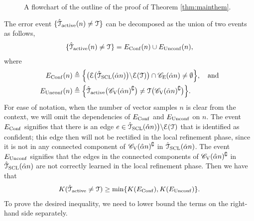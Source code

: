 \begin{figure}[t]
	\caption{A flowchart of the outline of the proof of Theorem \ref{thm:mainthem}.} 
	\label{fig:prooffig} 
\end{figure}
The error event $\{\hat{\mathcal{T}}_{{\rm active}}(n)\neq \mathcal{T}\}$ can be decomposed as the union of two events as follows,
\begin{align}
	\{\hat{\mathcal{T}}_{{\rm active}}(n)\neq \mathcal{T}\}=E_{{\rm Conf}}(n)\cup E_{{\rm Unconf}}(n),
\end{align}
where
\begin{align}
	E_{{\rm Conf}}(n)&\triangleq\Big\{\big(\mathcal{E}\big(\hat{\mathcal{T}}_{\rm{SCL}}(\hat{\alpha} n)\big)\backslash \mathcal{E}(\mathcal{T})\big)\cap \mathscr{C}_{\mathrm{E}}(\hat{\alpha} n)\neq \emptyset\Big\},\quad\text{and}\\*
	E_{{\rm Unconf}}(n)&\triangleq\Big\{\hat{\mathcal{T}}_{{\rm active}}\big(\mathscr{C}_{\mathrm{V}}(\hat{\alpha} n)^{\complement}\big)\neq \mathcal{T}\big(\mathscr{C}_{\mathrm{V}}(\hat{\alpha} n)^{\complement}\big)\Big\}.
\end{align}
For ease of notation, when the number of vector samples $n$ is clear from the context, we will omit the dependencies of   $E_{{\rm Conf}}$ and $E_{{\rm Unconf}}$ on $n$. The event $E_{{\rm Conf}}$ signifies that there is an edge $e\in \hat{\mathcal{T}}_{\rm{SCL}}(\hat{\alpha} n)\big)\backslash \mathcal{E}(\mathcal{T})$ that is identified as confident; this edge then will not be 
rectified in the local refinement phase, since it is not in any connected component of $\mathscr{C}_{\mathrm{V}}(\hat{\alpha} n)^{\complement}$ in $\hat{\mathcal{T}}_{{\rm SCL}}(\hat{\alpha} n)$. The event $E_{{\rm Unconf}}$ signifies that the edges in the connected components of $\mathscr{C}_{\mathrm{V}}(\hat{\alpha} n)^{\complement}$ 
in $\hat{\mathcal{T}}_{{\rm SCL}}(\hat{\alpha} n)$ are not correctly learned in the local refinement phase. Then we have that
\begin{align}
	K (\hat{\mathcal{T}}_{{\rm active}}\neq \mathcal{T})\geq \min \{K (E_{{\rm Conf}}),K (E_{{\rm Unconf}})\}.
\end{align}
To prove the desired inequality, we need to lower bound the terms on the right-hand side separately. 

